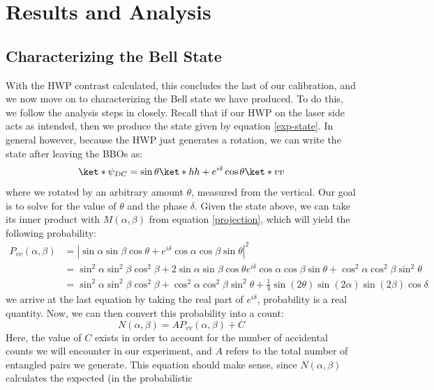 \documentclass[10pt]{article}
\begin{document}
	\section{Results and Analysis} 
	\subsection{Characterizing the Bell State}

	With the HWP contrast calculated, this concludes the last of our calibration, and we now move on to
	characterizing the Bell state we have produced. To do this, we follow the analysis steps in
	\cite{dehlinger}
	closely. Recall that if our HWP on the laser side acts as
	intended, then we produce the state given by equation \ref{exp-state}. In general however, because the
	HWP just generates a rotation, we can write the state after leaving the BBOs as: 
	\[
		\ket*{\psi_{DC}} = \sin \theta \ket*{hh} + e^{i \delta} \cos \theta \ket*{vv}
	\]
	where we rotated by an arbitrary amount \( \theta \), measured from the vertical. 
	Our goal is to solve for the value of \( \theta \) and the phase \( \delta \). 
	Given the state above, we can take its inner product with \( M(\alpha, \beta) \) 
	from equation \ref{projection}, which will yield the following probability:
	\begin{align*}
		P_{vv}(\alpha, \beta) &= |\sin \alpha \sin \beta \cos \theta + e^{i \delta}\cos \alpha \cos \beta \sin
		\theta|^2 \\
							  &= \sin^2 \alpha \sin^2\beta \cos^2 \beta + 2 \sin \alpha \sin \beta \cos \theta e^{i
		\delta}\cos \alpha \cos \beta \sin \theta + \cos^2 \alpha \cos^2 \beta \sin^2 \theta\\
		&= \sin^2 \alpha \sin^2 \beta \cos^2 \beta + \cos^2 \alpha \cos^2 \beta \sin^2 \theta +
		\frac{1}{4}\sin(2 \theta) \sin(2 \alpha) \sin (2 \beta) \cos \delta 
	\end{align*}
	we arrive at the last equation by taking the real part of \( e^{i \delta} \), probability is a real
	quantity. Now, we can then convert this probability into a count:
	\begin{equation}
		\label{count}
		N(\alpha, \beta) = A P_{vv}(\alpha, \beta) + C
	\end{equation}
	Here, the value of \( C \) exists in order to account for the number of accidental counts we will
	encounter in our experiment, and \( A \) refers to the total number of entangled pairs we generate. This
	equation should make sense, since \( N(\alpha, \beta) \) calculates the expected (in the probabilistic
\end{document}
